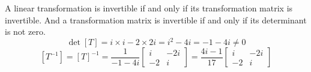 \documentclass{article}
\newenvironment{answers}{ %
	\begin{enumerate}
		\setlength{\itemsep}{\bigskipamount}
}{\end{enumerate}}
\begin{document}
\begin{answers}
\begin{enumerate}
				A linear transformation is invertible if and only if its transformation matrix is invertible. And a transformation matrix is invertible if and only if its determinant is not zero.
				\begin{equation*}
					\det [T] = i \times i - 2 \times 2i = i^2 - 4i = -1 - 4i \neq 0
				\end{equation*}
				\begin{equation*}
					\left[ T^{-1} \right] = [T]^{-1}
					= \frac{1}{-1-4i}\left[ \begin{matrix} i & -2i \\ -2 & i \end{matrix} \right]
					= \frac{4i-1}{17}\left[ \begin{matrix} i & -2i \\ -2 & i \end{matrix} \right]
				\end{equation*}
		\end{enumerate}


\end{answers}
\end{document}
